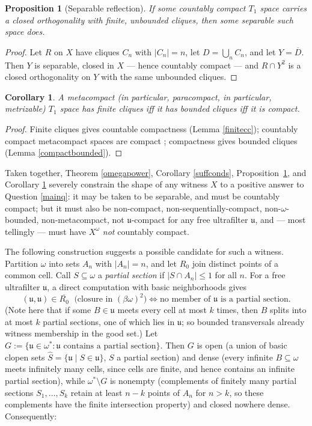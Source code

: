 \documentclass[12pt]{article}
\renewcommand{\u}{\mathfrak{u}}
\theoremstyle{plain}
\newtheorem{corollary}{Corollary}
\newtheorem{proposition}{Proposition}
\theoremstyle{definition}
\theoremstyle{remark}
\begin{document}
\begin{proposition}[Separable reflection]\label{separable}
If some countably compact $T_1$ space carries a closed orthogonality with finite, unbounded cliques, then some {\em separable} such space does.
\end{proposition}

\begin{proof}
Let $R$ on $X$ have cliques $C_n$ with $|C_n| = n$, let $D = \bigcup_n C_n$, and let $Y = \overline{D}$. Then $Y$ is separable, closed in $X$ --- hence countably compact --- and $R \cap Y^2$ is a closed orthogonality on $Y$ with the same unbounded cliques.
\end{proof}

\begin{corollary}\label{metacompact}
A metacompact (in particular, paracompact, in particular, metrizable) $T_1$ space has finite cliques iff it has bounded cliques iff it is compact. 
\end{corollary}

\begin{proof}
Finite cliques gives countable compactness (Lemma \ref{finitecc}); countably compact metacompact spaces are compact \cite{AD}; compactness gives bounded cliques (Lemma \ref{compactbounded}).
\end{proof}

Taken together, Theorem \ref{omegapower}, Corollary \ref{suffconds}, Proposition~\ref{separable}, and Corollary \ref{metacompact} severely constrain the shape of any witness $X$ to a positive answer to Question \ref{mainq}: it may be taken to be separable, and must be countably compact; 
 but it must also be non-compact, non-sequentially-compact, non-$\omega$-bounded, non-metacompact, not $\u$-compact for any free ultrafilter $\u$, and --- most tellingly --- must have $X^{\omega}$ {\em not} countably compact.  



The following construction suggests a possible 
candidate for such a witness.  Partition $\omega$ into sets $A_n$ with $|A_n| = n$, and let $R_0$ join distinct points of a common cell. Call $S \subseteq \omega$ a {\em partial section} if $|S \cap A_n| \leq 1$ for all $n$. For a free ultrafilter $\mathfrak{u}$, a direct computation with basic neighborhoods gives
\[ (\u,\u) \in \overline{R_0} \; \mbox{ (closure in } (\beta\omega)^2 \mbox{)} \iff \mbox{no member of } 
\u \mbox{ is a partial section}. \]
(Note here that if some $B \in \u$ meets every cell at most $k$ times, then $B$ splits into at most $k$ partial sections, one of which lies in $\u$; so bounded transversals already witness membership in the good set.) 
Let $G := \{ \u \in \omega^* : \u \mbox{ contains a partial section} \}$. Then $G$ is open (a union of basic clopen sets $\widehat{S} = \{ \u \mid S \in \u\}$, $S$ a partial section) and dense (every infinite $B \subseteq \omega$ meets infinitely many cells, since cells are finite, { and} hence contains an infinite partial section), while $\omega^* \setminus G$ is nonempty (complements of finitely many partial sections $S_1, \dots, S_k$ retain at least $n - k$ points of $A_n$ { for $n > k$}, so these complements have the finite intersection property) and closed nowhere dense. Consequently:
\end{document}
